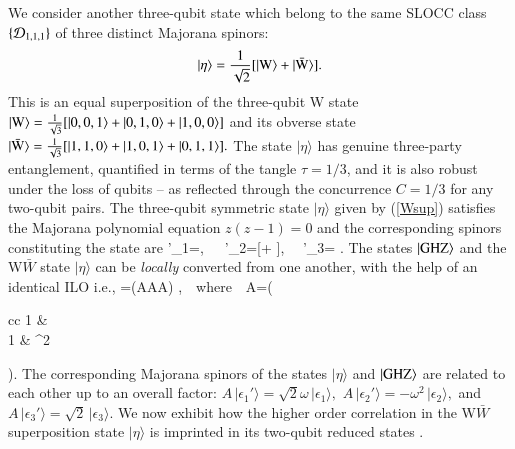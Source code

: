 {We  consider another three-qubit state which belong to the same SLOCC class $\{{\cal D}_{1,1,1}\}$ of three distinct Majorana spinors: 
\begin{equation}
\label{Wsup}
\vert \eta\rangle = \frac{1}{\sqrt{2}} [\vert {\rm W}\rangle +  \vert{\rm \bar{W}}\rangle]. 
\end{equation}         
This  is an equal superposition of the three-qubit W state $\vert{\rm W}\rangle=\frac{1}{\sqrt{3}}[\vert 0,0,1\rangle+\vert 0,1,0\rangle+\vert 1,0,0\rangle]$  
 and its obverse state 
$\vert{\rm \bar{W}}\rangle=\frac{1}{\sqrt{3}}[\vert 1,1,0\rangle+\vert 1,0,1\rangle+\vert 
0,1,1\rangle].$ 
The state $\vert \eta\rangle$ has genuine three-party entanglement, quantified in terms of the tangle 
$\tau=1/3$, and it is also robust under the loss of qubits -- as reflected through the concurrence $C=1/3$ for 
any two-qubit pairs.  The three-qubit symmetric state $\vert \eta\rangle$ given by (\ref{Wsup}) satisfies the Majorana polynomial 
equation $z(z-1)=0$  and the corresponding spinors constituting the state are 
\be
\vert \epsilon'_1\rangle =\rangle,\ \ \  \vert \epsilon'_2\rangle =[\rangle+ \rangle], \ \  
\vert \epsilon'_3\rangle = \rangle. 
\ee
 The states $\vert {\rm GHZ}\rangle$ and the W$\bar W$ 
state $\vert \eta\rangle$   can be {\em locally} converted from one another,  with the help of an identical ILO i.e.,
\be
\label{GHZ&eta}
\rangle=\left(A\otimes A\otimes A\right) \vert \eta\rangle,\ \   \mbox{where}\ \ 
A=\left(\begin{array}{cc} 1 & \omega \\ 1 & \omega^2\, \end{array}\right).
\ee
The corresponding Majorana spinors  of the states $\vert \eta\rangle$ and $\vert{\rm GHZ}\rangle$ are  related to each other 
up to an overall factor:   
$A\, \vert\epsilon_1'\rangle=\sqrt{2}\omega\, \vert\epsilon_1\rangle,$   
$A\, \vert\epsilon_2'\rangle=-\omega^2\, \vert\epsilon_2\rangle,$ 
and $A\, \vert\epsilon_3'\rangle=   \sqrt{2}\,  \vert\epsilon_3\rangle$.  
We now exhibit how the higher order correlation in  the W$\bar W$ superposition state $\vert \eta\rangle$ is imprinted in its two-qubit reduced states \cite{SP1,usa,usa1,usa2}. 

}
